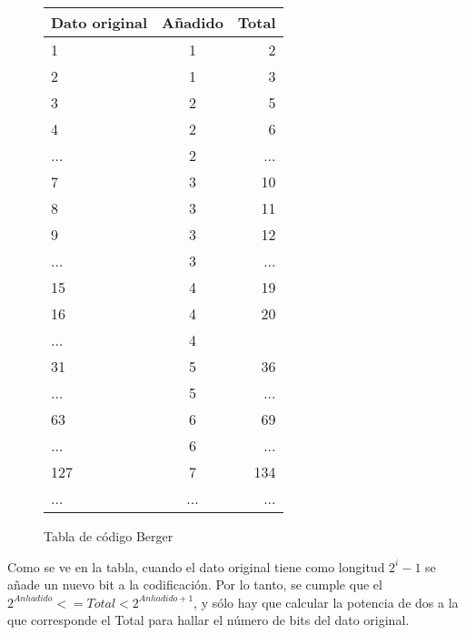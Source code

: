 \documentclass[a4paper]{article}
\begin{document}
	\begin{figure}
		\begin{tabular}{| l | c | r |}
				\hline
				Dato original & Añadido & Total \\ \hline
				\rowcolor{LightCyan}
				1 & 1 & 2 \\ \hline
				2 & 1 & 3 \\ \hline
				\rowcolor{LightCyan}
				3 & 2 & 5 \\ \hline
				4 & 2 & 6 \\ \hline
				... & 2 & ... \\ \hline
				\rowcolor{LightCyan}
				7 & 3 & 10 \\ \hline
				8 & 3 & 11 \\ \hline
				9 & 3 & 12 \\ \hline
				... & 3 & ... \\ \hline
				\rowcolor{LightCyan}
				15 & 4 & 19 \\ \hline
				16 & 4 & 20 \\ \hline
				... & 4 &  \\ \hline
				\rowcolor{LightCyan}
				31 & 5 & 36 \\ \hline
				... & 5 & ... \\ \hline
				\rowcolor{LightCyan}
				63 & 6 & 69 \\ \hline
				... & 6 & ... \\ \hline
				\rowcolor{LightCyan}
				127 & 7 & 134 \\ \hline
				... & ... & ... \\ 
				\hline
		\end{tabular}

		\label{t_berger}
		\caption{Tabla de código Berger}
	\end{figure}
	Como se ve en la tabla, cuando el dato original tiene como longitud $2^i - 1$ se añade un nuevo bit a la codificación. Por lo tanto, se cumple que el $ 2^{Anhadido} <= Total < 2^{Anhadido+1}$, y sólo hay que calcular la potencia de dos a la que corresponde el Total para hallar el número de bits del dato original.

%	

%	
\end{document}
